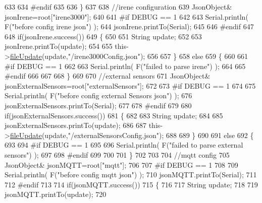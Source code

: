 \begin{DoxyCode}
633     
634 \textcolor{preprocessor}{    #endif}
635 
636     \}
637     
638     \textcolor{comment}{//irene configuration   }
639         JsonObject& jsonIrene=root[\textcolor{stringliteral}{"irene3000"}];
640     
641 \textcolor{preprocessor}{#if DEBUG == 1 }
642 
643     Serial.println( F(\textcolor{stringliteral}{"before config irene json"}) );    
644     jsonIrene.printTo(Serial);
645 
646 \textcolor{preprocessor}{#endif }
647 
648     \textcolor{keywordflow}{if}(jsonIrene.success())
649     \{
650 
651         String update;
652     
653         jsonIrene.printTo(update);
654 
655         this->\hyperlink{class_cool_file_system_a13f2958f5b87757c31fc53797a30d23a}{fileUpdate}(update,\textcolor{stringliteral}{"/irene3000Config.json"});     
656     
657     \}
658     \textcolor{keywordflow}{else}
659     \{
660     
661 \textcolor{preprocessor}{    #if DEBUG == 1 }
662 
663         Serial.println( F(\textcolor{stringliteral}{"failed to parse irene"}) );   
664     
665 \textcolor{preprocessor}{    #endif }
666 
667 
668     \}
669     
670     \textcolor{comment}{//external sensors}
671         JsonObject& jsonExternalSensors=root[\textcolor{stringliteral}{"externalSensors"}];
672 
673 \textcolor{preprocessor}{#if DEBUG == 1 }
674 
675     Serial.println( F(\textcolor{stringliteral}{"before config external Sensors json"}) );
676     jsonExternalSensors.printTo(Serial);
677 
678 \textcolor{preprocessor}{#endif}
679 
680     \textcolor{keywordflow}{if}(jsonExternalSensors.success())
681     \{
682 
683         String update;
684     
685         jsonExternalSensors.printTo(update);
686 
687         this->\hyperlink{class_cool_file_system_a13f2958f5b87757c31fc53797a30d23a}{fileUpdate}(update,\textcolor{stringliteral}{"/externalSensorsConfig.json"});       
688 
689     \}
690 
691     \textcolor{keywordflow}{else}
692     \{   
693 
694 \textcolor{preprocessor}{    #if DEBUG == 1}
695         
696         Serial.println( F(\textcolor{stringliteral}{"failed to parse external sensors"}) );
697 
698 \textcolor{preprocessor}{    #endif}
699 
700 
701     \}
702 
703     
704     \textcolor{comment}{//mqtt config}
705         JsonObject& jsonMQTT=root[\textcolor{stringliteral}{"mqtt"}];
706     
707 \textcolor{preprocessor}{#if DEBUG == 1 }
708 
709     Serial.println( F(\textcolor{stringliteral}{"before config mqtt json"}) );
710     jsonMQTT.printTo(Serial);
711 
712 \textcolor{preprocessor}{#endif}
713 
714     \textcolor{keywordflow}{if}(jsonMQTT.success())
715     \{
716 
717         String update;
718     
719         jsonMQTT.printTo(update);
720 

\end{DoxyCode}
